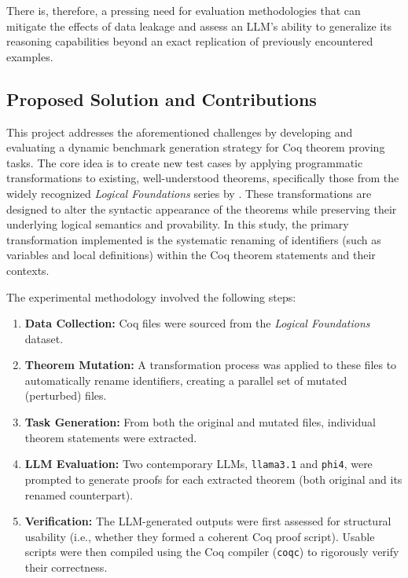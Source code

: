 There is, therefore, a pressing need for evaluation methodologies that can mitigate the effects of data leakage and assess an LLM's ability to generalize its reasoning capabilities beyond an exact replication of previously encountered examples.

\subsection{Proposed Solution and Contributions}
\label{sec:intro_solution}

This project addresses the aforementioned challenges by developing and evaluating a dynamic benchmark generation strategy for Coq theorem proving tasks. The core idea is to create new test cases by applying programmatic transformations to existing, well-understood theorems, specifically those from the widely recognized \emph{Logical Foundations} series by \citet{PierceSF:LF2024}. These transformations are designed to alter the syntactic appearance of the theorems while preserving their underlying logical semantics and provability. In this study, the primary transformation implemented is the systematic renaming of identifiers (such as variables and local definitions) within the Coq theorem statements and their contexts.

The experimental methodology involved the following steps:
\begin{enumerate}
    \item \textbf{Data Collection:} Coq files were sourced from the \emph{Logical Foundations} dataset.
    \item \textbf{Theorem Mutation:} A transformation process was applied to these files to automatically rename identifiers, creating a parallel set of mutated (perturbed) files.
    \item \textbf{Task Generation:} From both the original and mutated files, individual theorem statements were extracted.
    \item \textbf{LLM Evaluation:} Two contemporary LLMs, \texttt{llama3.1} and \texttt{phi4}, were prompted to generate proofs for each extracted theorem (both original and its renamed counterpart).
    \item \textbf{Verification:} The LLM-generated outputs were first assessed for structural usability (i.e., whether they formed a coherent Coq proof script). Usable scripts were then compiled using the Coq compiler (\texttt{coqc}) to rigorously verify their correctness.
\end{enumerate}

